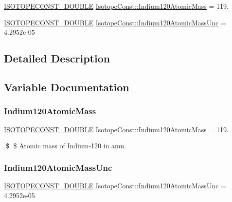 \begin{DoxyCompactItemize}
\item 
\mbox{\hyperlink{group___isotope_const-_macros_ga8f45a7272ce02c0b4c65c44636ed719a}{I\+S\+O\+T\+O\+P\+E\+C\+O\+N\+S\+T\+\_\+\+D\+O\+U\+B\+LE}} \mbox{\hyperlink{group___isotope_const-_indium-_in120_ga83b9e048bdd4225ec741b2ee828f926c}{Isotope\+Const\+::\+Indium120\+Atomic\+Mass}} = 119.
\item 
\mbox{\hyperlink{group___isotope_const-_macros_ga8f45a7272ce02c0b4c65c44636ed719a}{I\+S\+O\+T\+O\+P\+E\+C\+O\+N\+S\+T\+\_\+\+D\+O\+U\+B\+LE}} \mbox{\hyperlink{group___isotope_const-_indium-_in120_gaeb216e55b59bee33869ed52e54ee32b3}{Isotope\+Const\+::\+Indium120\+Atomic\+Mass\+Unc}} = 4.\+2952e-\/05
\end{DoxyCompactItemize}


\subsection{Detailed Description}


\subsection{Variable Documentation}
\mbox{\label{group___isotope_const-_indium-_in120_ga83b9e048bdd4225ec741b2ee828f926c}} 
\subsubsection{\texorpdfstring{Indium120\+Atomic\+Mass}{Indium120AtomicMass}}
{\footnotesize\ttfamily \mbox{\hyperlink{group___isotope_const-_macros_ga8f45a7272ce02c0b4c65c44636ed719a}{I\+S\+O\+T\+O\+P\+E\+C\+O\+N\+S\+T\+\_\+\+D\+O\+U\+B\+LE}} Isotope\+Const\+::\+Indium120\+Atomic\+Mass = 119.}

\$ \$ Atomic mass of Indium-\/120 in amu. \mbox{\label{group___isotope_const-_indium-_in120_gaeb216e55b59bee33869ed52e54ee32b3}} 
\subsubsection{\texorpdfstring{Indium120\+Atomic\+Mass\+Unc}{Indium120AtomicMassUnc}}
{\footnotesize\ttfamily \mbox{\hyperlink{group___isotope_const-_macros_ga8f45a7272ce02c0b4c65c44636ed719a}{I\+S\+O\+T\+O\+P\+E\+C\+O\+N\+S\+T\+\_\+\+D\+O\+U\+B\+LE}} Isotope\+Const\+::\+Indium120\+Atomic\+Mass\+Unc = 4.\+2952e-\/05}

